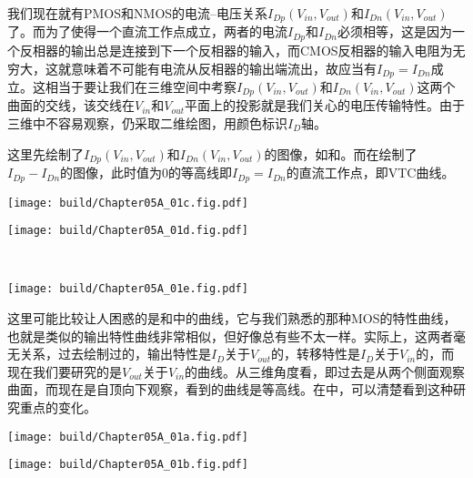 我们现在就有PMOS和NMOS的电流--电压关系$I_{Dp}(V_{in},V_{out})$和$I_{Dn}(V_{in},V_{out})$了。而为了使得一个直流工作点成立，两者的电流$I_{Dp}$和$I_{Dn}$必须相等，这是因为一个反相器的输出总是连接到下一个反相器的输入，而CMOS反相器的输入电阻为无穷大，这就意味着不可能有电流从反相器的输出端流出，故应当有$I_{Dp}=I_{Dn}$成立。这相当于要让我们在三维空间中考察$I_{Dp}(V_{in},V_{out})$和$I_{Dn}(V_{in},V_{out})$这两个曲面的交线，该交线在$V_{in}$和$V_{out}$平面上的投影就是我们关心的电压传输特性。由于三维中不容易观察，仍采取二维绘图，用颜色标识$I_{D}$轴。

这里先绘制了$I_{Dp}(V_{in},V_{out})$和$I_{Dn}(V_{in},V_{out})$的图像，如和。而在绘制了$I_{Dp}-I_{Dn}$的图像，此时值为$0$的等高线即$I_{Dp}=I_{Dn}$的直流工作点，即VTC曲线。

\begin{Figure}[CMOS反相器的电压传输特性分析]
    \begin{FigureSub}[NMOS特性示意]
        \texttt{[image: build/Chapter05A\_01c.fig.pdf]}
    \end{FigureSub}
    \begin{FigureSub}[PMOS特性示意]
        \texttt{[image: build/Chapter05A\_01d.fig.pdf]}
    \end{FigureSub}\\ \vspace{0.35cm}
    \begin{FigureSub}[CMOS的电压传输特性示意]
        \texttt{[image: build/Chapter05A\_01e.fig.pdf]}
    \end{FigureSub}
\end{Figure}

这里可能比较让人困惑的是和中的曲线，它与我们熟悉的那种MOS的特性曲线，也就是类似的输出特性曲线非常相似，但好像总有些不太一样。实际上，这两者毫无关系，过去绘制过的，输出特性是$I_D$关于$V_{out}$的，转移特性是$I_{D}$关于$V_{in}$的，而现在我们要研究的是$V_{out}$关于$V_{in}$的曲线。从三维角度看，即过去是从两个侧面观察曲面，而现在是自顶向下观察，看到的曲线是等高线。在中，可以清楚看到这种研究重点的变化。
\begin{Figure}[MOS特性曲面网格的对比]
    \begin{FigureSub}[坐标线网格]
        \texttt{[image: build/Chapter05A\_01a.fig.pdf]}
    \end{FigureSub}
    \hspace{1cm}
    \begin{FigureSub}[等高线网格]
        \texttt{[image: build/Chapter05A\_01b.fig.pdf]}
    \end{FigureSub}
\end{Figure}

